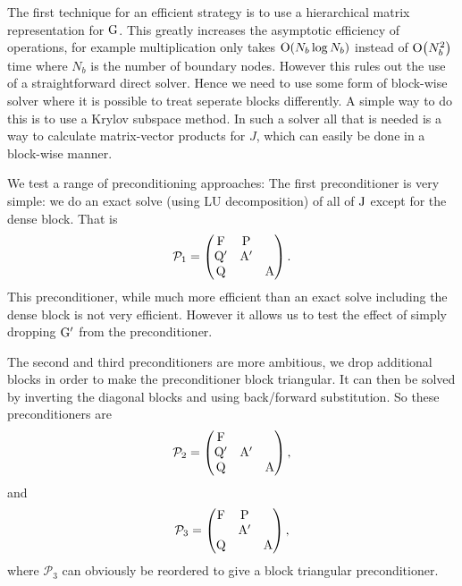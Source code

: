 The first technique for an efficient strategy is to use a hierarchical matrix representation for ${\mathbf{\mathrm{G}}}$.
This greatly increases the asymptotic efficiency of operations, for example multiplication only takes $\mathrm{O}{\left( N_b \log N_b \right)}$ instead of $\mathrm{O}{\left( N_b^2 \right)}$ time where $N_b$ is the number of boundary nodes.
However this rules out the use of a straightforward direct solver.
Hence we need to use some form of block-wise solver where it is possible to treat seperate blocks differently.
A simple way to do this is to use a Krylov subspace method.
In such a solver all that is needed is a way to calculate matrix-vector products for $J$, which can easily be done in a block-wise manner.

\newcommand{\prcd}{\mathcal{P}}

We test a range of preconditioning approaches:
The first preconditioner is very simple: we do an exact solve (using LU decomposition) of all of $\mathrm{J}$ except for the dense block.
That is
\begin{equation}
  \prcd_{1} = 
  \begin{pmatrix}
    \Fm       & \Pm     &  \\
    \Qm'       & \Am'    &   \\
    \Qm       &         &   \Am
  \end{pmatrix}.
\end{equation}
This preconditioner, while much more efficient than an exact solve including the dense block is not very efficient.
However it allows us to test the effect of simply dropping $\mathrm{G}'$ from the preconditioner.

The second and third preconditioners are more ambitious, we drop additional blocks in order to make the preconditioner block triangular.
It can then be solved by inverting the diagonal blocks and using back/forward substitution.
So these preconditioners are
\begin{equation}
  \prcd_{2} = 
  \begin{pmatrix}
    \Fm       &           &  \\
    \Qm'       & \Am'&   \\
    \Qm       &           &   \Am
  \end{pmatrix},
  \label{eq:ms-block-prec-drop-p}
\end{equation}
and
\begin{equation}
  \prcd_{3} = 
  \begin{pmatrix}
    \Fm       & \Pm       &  \\
    & \Am' &   \\
    \Qm       &           &   \Am
  \end{pmatrix},
  \label{eq:ms-block-prec-drop-q}
\end{equation}
where $\prcd_{3}$ can obviously be reordered to give a block triangular preconditioner.

